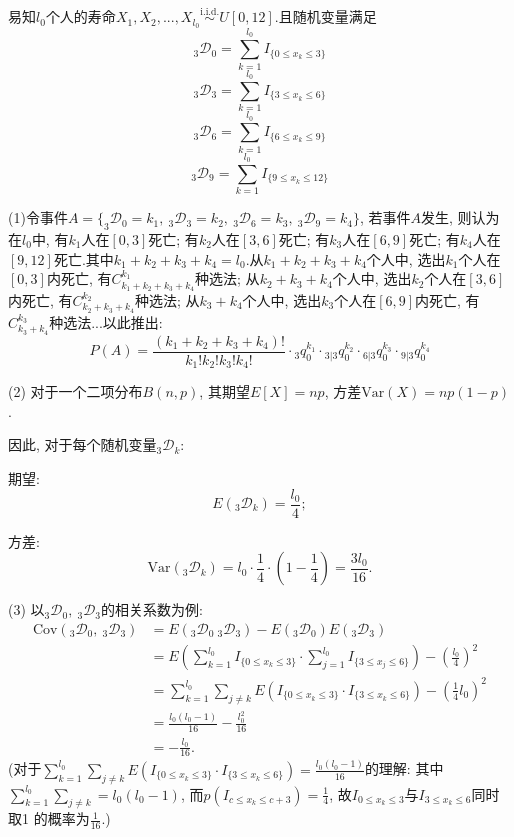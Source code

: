 \documentclass[a4paper,10pt]{ctexbook}
\begin{document}
\solution
易知$l_{0}$个人的寿命$X_{1},X_{2},...,X_{l_{0}}\stackrel{\text{i.i.d.}}{\sim}U[0,12]$.且随机变量满足
$$_{3}\mathscr D _{0}=\sum^{l_{0}}_{k=1}I_{\{0\leq x_k \leq 3\}}$$
$$_{3}\mathscr D _{3}=\sum^{l_{0}}_{k=1}I_{\{3\leq x_k \leq 6\}}$$
$$_{3}\mathscr D _{6}=\sum^{l_{0}}_{k=1}I_{\{6\leq x_k \leq 9\}}$$
$$_{3}\mathscr D _{9}=\sum^{l_{0}}_{k=1}I_{\{9\leq x_k \leq 12\}}$$

(1)令事件$A=\{_{3}\mathscr D _{0}=k_{1},\ _{3}\mathscr D _{3}=k_{2},\ _{3}\mathscr D _{6}=k_{3},\ _{3}\mathscr D _{9}=k_{4}\}$, 若事件$A$发生, 则认为在$l_{0}$中, 有$k_{1}$人在$[0,3]$死亡; 有$k_{2}$人在$[3,6]$死亡; 有$k_{3}$人在$[6,9]$死亡; 有$k_{4}$人在$[9,12]$死亡.其中$k_{1}+k_{2}+k_{3}+k_{4}=l_{0}.$从$k_{1}+k_{2}+k_{3}+k_{4}$个人中, 选出$k_{1}$个人在$[0,3]$内死亡, 有$C_{k_{1}+k_{2}+k_{3}+k_{4}}^{k_{1}}$种选法; 从$k_{2}+k_{3}+k_{4}$个人中, 选出$k_{2}$个人在$[3,6]$内死亡, 有$C_{k_{2}+k_{3}+k_{4}}^{k_{2}}$种选法; 从$k_{3}+k_{4}$个人中, 选出$k_{3}$个人在$[6,9]$内死亡, 有$C_{k_{3}+k_{4}}^{k_{3}}$种选法...以此推出:
$$
    P(A)=\frac{(k_{1}+k_{2}+k_{3}+k_{4})!}{k_{1}!k_{2}!k_{3}!k_{4}!}\cdot {}_{3}q_{0}^{k_{1}}\cdot {}_{3|3}q_{0}^{k_{2}}\cdot {}_{6|3}q_{0}^{k_{3}}\cdot {}_{9|3}q_{0}^{k_{4}}
$$

(2) 对于一个二项分布$B(n, p)$, 其期望$E[X] = np$, 方差$\text{Var}(X) = np(1-p)$.

因此, 对于每个随机变量$_{3}\mathscr D_{k}$:

期望: $$E(_{3}\mathscr D_{k}) = \frac{l_0}{4};$$

方差: $$\text{Var}(_{3}\mathscr D_{k}) = l_0 \cdot \frac{1}{4} \cdot \left(1 - \frac{1}{4}\right) = \frac{3l_0}{16}.$$

(3) 以$_{3}\mathscr D _{0},\ _{3}\mathscr D _{3}$的相关系数为例:
\begin{align*}
    \text{Cov}(_{3}\mathscr D _{0},\ _{3}\mathscr D _{3}) & =E(_{3}\mathscr D _{0}\ _{3}\mathscr D _{3})-E(_{3}\mathscr D _{0})E(_{3}\mathscr D _{3})                                \\
                                                          & =E(\sum ^{l_{0}}_{k=1}I_{\{0\leq x_{k}\leq 3\}}\cdot \sum ^{l_{0}}_{j=1}I_{\{3\leq x_{j}\leq 6\}})-(\frac{l_{0}}{4})^{2} \\
                                                          & =\sum^{l_{0}}_{k=1}\sum_{j\neq k}E(I_{\{0\leq x_{k}\leq 3\}}\cdot I_{\{3\leq x_{k}\leq 6\}})-(\frac{1}{4}l_{0})^{2}      \\
                                                          & =\frac{l_{0}(l_{0}-1)}{16}-\frac{l_{0}^{2}}{16}                                                                          \\
                                                          & =-\frac{l_{0}}{16}.
\end{align*}
(对于$\sum^{l_{0}}_{k=1}\sum_{j\neq k}E(I_{\{0\leq x_{k}\leq 3\}}\cdot I_{\{3\leq x_{k}\leq 6\}}) = \frac{l_{0}(l_{0}-1)}{16}$的理解: 其中$\sum^{l_{0}}_{k=1}\sum_{j\neq k} = l_0(l_0-1)$, 而$p(I_{c\leq x_{k}\leq c+3}) = \frac14$, 故$I_{0\leq x_{k}\leq 3}$与$I_{3\leq x_{k}\leq 6}$同时取1 的概率为$\frac{1}{16}$.)
\end{document}
